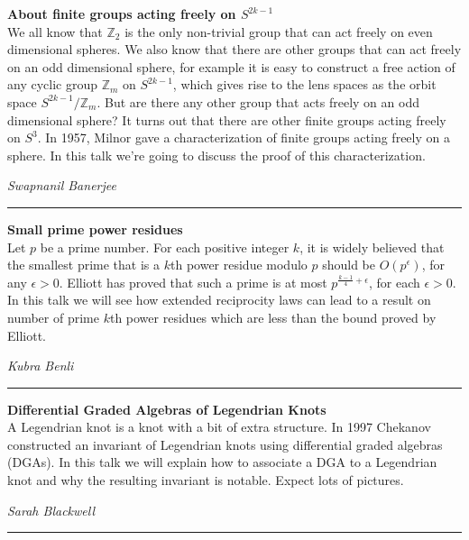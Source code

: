 \documentclass[oneside]{amsart}
\begin{document}
\filbreak
\hspace{-20pt}\textbf{ \textbf{ About finite groups acting freely on $S^{2k-1}$ } } \vspace{0.5em}\\
We all know that $\mathbb{Z}_2$ is the only non-trivial group that can act freely on even dimensional spheres. We also know that there are other groups that can act freely on an odd dimensional sphere, for example it is easy to construct a free action of any cyclic group $\mathbb{Z}_m$ on $S^{2k-1}$, which gives rise to the lens spaces as the orbit space $S^{2k-1}/\mathbb{Z}_m$. But are there any other group that acts freely on an odd dimensional sphere? It turns out that there are other finite groups acting freely on $S^3$. In 1957, Milnor gave a characterization of finite groups acting freely on a sphere. In this talk we're going to discuss the proof of this characterization. \vspace{-1em}\\
\begin{flushright} \textit{ Swapnanil Banerjee } \vspace{0.5em} \end{flushright}
\rule{\textwidth}{0.4pt}
\vspace{0.5em}

\filbreak
\hspace{-20pt}\textbf{ \textbf{ Small prime power residues } } \vspace{0.5em}\\
Let $p$ be a prime number. For each positive integer $k$, it is widely believed that the smallest prime that is a $k$th power residue modulo $p$ should be $O(p^{\epsilon})$, for any $\epsilon>0$. Elliott has proved that such a prime is at most $p^{\frac{k-1}{4}+\epsilon}$, for each $\epsilon>0$. In this talk we will see how extended reciprocity laws can lead to a result on number of prime $k$th power residues which are less than the bound proved by Elliott. \vspace{-1em}\\
\begin{flushright} \textit{ Kubra Benli } \vspace{0.5em} \end{flushright}
\rule{\textwidth}{0.4pt}
\vspace{0.5em}

\filbreak
\hspace{-20pt}\textbf{ \textbf{ Differential Graded Algebras of Legendrian Knots } } \vspace{0.5em}\\
A Legendrian knot is a knot with a bit of extra structure. In 1997 Chekanov constructed an invariant of Legendrian knots using differential graded algebras (DGAs). In this talk we will explain how to associate a DGA to a Legendrian knot and why the resulting invariant is notable. Expect lots of pictures. \vspace{-1em}\\
\begin{flushright} \textit{ Sarah Blackwell } \vspace{0.5em} \end{flushright}
\rule{\textwidth}{0.4pt}
\vspace{0.5em}
\end{document}
